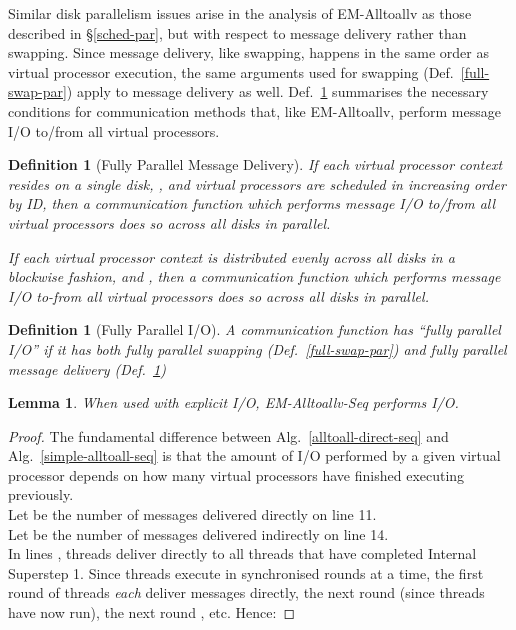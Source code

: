 \documentclass[12pt]{carletoncsthesis}
\newtheorem{lemma}[thm]{Lemma}
\newtheorem{definition}[thm]{Definition}
\begin{document}
Similar disk parallelism issues arise in the analysis of {\sc EM-Alltoallv}
as those described in \S\ref{sched-par}, but with respect to message delivery
rather than swapping.  Since message delivery, like swapping, happens in
the same order as virtual processor execution, the same arguments used for
swapping (Def.~\ref{full-swap-par}) apply to message delivery as well.
Def.~\ref{full-delivery-par} summarises the necessary conditions for
communication methods that, like {\sc EM-Alltoallv}, perform message I/O
to/from all virtual processors.

\begin{definition}[Fully Parallel Message Delivery]
If each virtual processor context resides on a single disk, ,
and virtual processors are scheduled in increasing order by ID, then a
communication function which performs message I/O to/from all virtual
processors does so across all  disks in parallel.

If each virtual processor context is distributed evenly across all disks in
a blockwise fashion, and , then a communication function which
performs message I/O to-from all virtual processors does so across all 
disks in parallel.
\label{full-delivery-par}
\end{definition}

\begin{definition}[Fully Parallel I/O]
A communication function has ``fully parallel I/O'' if it has both
fully parallel swapping (Def.~\ref{full-swap-par}) and fully parallel
message delivery (Def.~\ref{full-delivery-par})
\label{full-disk-par}
\end{definition}

\begin{lemma}
\label{alltoall-direct-seq-io}
When used with explicit I/O, {\sc EM-Alltoallv-Seq} performs
 I/O.
\end{lemma}
\begin{proof}
The fundamental difference between Alg.~\ref{alltoall-direct-seq} and
Alg.~\ref{simple-alltoall-seq} is that the amount of I/O performed by a
given virtual processor depends on how many virtual processors have finished
executing previously.\\
Let  be the number of messages delivered directly on line 11.\\
Let  be the number of messages delivered indirectly on line 14.\\
In lines , threads deliver directly to all threads that have
completed Internal Superstep 1.  Since threads execute in synchronised
rounds  at a time, the first round of  threads {\em each} deliver 
messages directly, the next round  (since  threads have now run),
the next round , etc.  Hence:

\end{proof}
\end{document}
